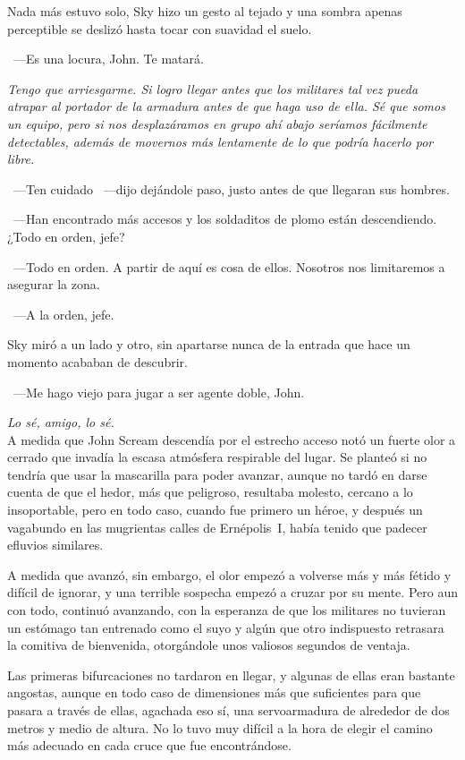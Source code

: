 Nada más estuvo solo, Sky hizo un gesto al tejado y una sombra apenas perceptible se deslizó hasta tocar con suavidad el suelo.

~---Es una locura, John. Te matará.

\emph{Tengo que arriesgarme. Si logro llegar antes que los militares tal vez pueda atrapar al portador de la armadura antes de que haga uso de ella. Sé que somos un equipo, pero si nos desplazáramos en grupo ahí abajo seríamos fácilmente detectables, además de movernos más lentamente de lo que podría hacerlo por libre.}

~---Ten cuidado ~---dijo dejándole paso, justo antes de que llegaran sus hombres.

~---Han encontrado más accesos y los soldaditos de plomo están descendiendo. ¿Todo en orden, jefe?

~---Todo en orden. A partir de aquí es cosa de ellos. Nosotros nos limitaremos a asegurar la zona.

~---A la orden, jefe.

Sky miró a un lado y otro, sin apartarse nunca de la entrada que hace un momento acababan de descubrir.

~---Me hago viejo para jugar a ser agente doble, John.

\emph{Lo sé, amigo, lo sé.}\\

\noindent{}A medida que John Scream descendía por el estrecho acceso notó un fuerte olor a cerrado que invadía la escasa atmósfera respirable del lugar. Se planteó si no tendría que usar la mascarilla para poder avanzar, aunque no tardó en darse cuenta de que el hedor, más que peligroso, resultaba molesto, cercano a lo insoportable, pero en todo caso, cuando fue primero un héroe, y después un vagabundo en las mugrientas calles de Ernépolis~I, había tenido que padecer efluvios similares.

A medida que avanzó, sin embargo, el olor empezó a volverse más y más fétido y difícil de ignorar, y una terrible sospecha empezó a cruzar por su mente. Pero aun con todo, continuó avanzando, con la esperanza de que los militares no tuvieran un estómago tan entrenado como el suyo y algún que otro indispuesto retrasara la comitiva de bienvenida, otorgándole unos valiosos segundos de ventaja.

Las primeras bifurcaciones no tardaron en llegar, y algunas de ellas eran bastante angostas, aunque en todo caso de dimensiones más que suficientes para que pasara a través de ellas, agachada eso sí, una servoarmadura de alrededor de dos metros y medio de altura. No lo tuvo muy difícil a la hora de elegir el camino más adecuado en cada cruce que fue encontrándose.

